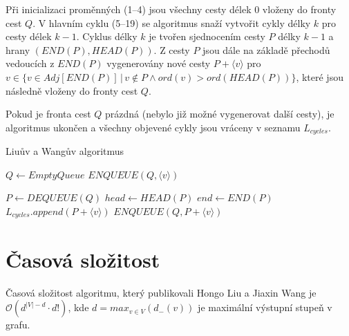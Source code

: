         Při inicializaci proměnných (1--4) jsou všechny cesty délek 0 vloženy do fronty cest $Q$. V hlavním cyklu (5--19) se algoritmus snaží vytvořit cykly délky $k$ pro cesty délek $k-1$. Cyklus délky $k$ je tvořen sjednocením cesty $P$ délky $k-1$ a hrany $(\textit{END}(P), \textit{HEAD}(P))$. Z cesty $P$ jsou dále na základě přechodů vedoucích z $\textit{END}(P)$ vygenerovány nové cesty $P + \langle v \rangle$ pro $v \in \{v \in Adj[\textit{END}(P)] \,|\, v \notin P \land ord(v) > ord(\textit{HEAD}(P))\}$, které jsou následně vloženy do fronty cest $Q$.

        Pokud je fronta cest $Q$ prázdná (nebylo již možné vygenerovat další cesty), je algoritmus ukončen a všechny objevené cykly jsou vráceny v seznamu $L_{cycles}$.

        \newpage

        \begin{algorithm}
            \DontPrintSemicolon
            \caption{Liuův a Wangův algoritmus}
            \vspace*{0.5em}

            \;
            $Q \leftarrow EmptyQueue$\;
            {
                $\mathit{ENQUEUE}(Q, \langle v \rangle)$\;
            }
            \vspace*{0.5em}

            {
                $P \leftarrow \mathit{DEQUEUE}(Q)$\;
                $head \leftarrow \mathit{HEAD}(P)$\;
                $end \leftarrow \mathit{END}(P)$\;
                {
                    {
                        $L_{cycles}.append(P + \langle v \rangle)$\;
                    }
                    {
                        {
                            $\mathit{ENQUEUE}(Q, P + \langle v \rangle)$\;
                        }
                    }
                }
            }
            \vspace*{0.5em}


        \end{algorithm}

    \section{Časová složitost}
        \begin{theorem}
            Časová složitost algoritmu, který publikovali Hongo Liu a Jiaxin Wang je $\mathcal{O}(d^{|V|-d}\cdot d!)$, kde $d = max_{v\in V}(d_-(v))$ je maximální výstupní stupeň v grafu.
        \end{theorem}

